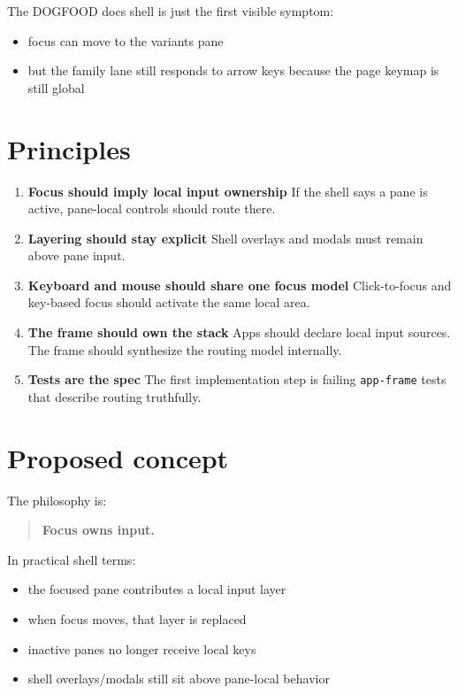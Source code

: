 The DOGFOOD docs shell is just the first visible symptom:

\begin{itemize}
\tightlist
\item
  focus can move to the variants pane
\item
  but the family lane still responds to arrow keys because the page keymap is still global
\end{itemize}

\section{Principles}\label{record-044-principles}

\begin{enumerate}
\def\labelenumi{\arabic{enumi}.}
\item
  \textbf{Focus should imply local input ownership} If the shell says a pane is active, pane-local controls should route there.
\item
  \textbf{Layering should stay explicit} Shell overlays and modals must remain above pane input.
\item
  \textbf{Keyboard and mouse should share one focus model} Click-to-focus and key-based focus should activate the same local area.
\item
  \textbf{The frame should own the stack} Apps should declare local input sources. The frame should synthesize the routing model internally.
\item
  \textbf{Tests are the spec} The first implementation step is failing \texttt{a\allowbreak{}p\allowbreak{}p\allowbreak{}-\allowbreak{}f\allowbreak{}r\allowbreak{}a\allowbreak{}m\allowbreak{}e} tests that describe routing truthfully.
\end{enumerate}

\section{Proposed concept}\label{record-044-proposed-concept}

The philosophy is:

\begin{quote}
\textbf{Focus owns input.}
\end{quote}

In practical shell terms:

\begin{itemize}
\tightlist
\item
  the focused pane contributes a local input layer
\item
  when focus moves, that layer is replaced
\item
  inactive panes no longer receive local keys
\item
  shell overlays/modals still sit above pane-local behavior
\end{itemize}


